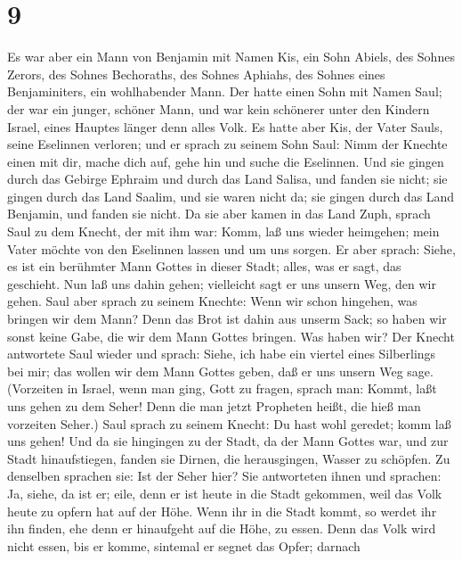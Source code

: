 \hypertarget{section-8}{%
\section{9}\label{section-8}}

 Es war aber ein Mann von Benjamin mit Namen Kis, ein Sohn
Abiels, des Sohnes Zerors, des Sohnes Bechoraths, des Sohnes Aphiahs,
des Sohnes eines Benjaminiters, ein wohlhabender Mann.  Der
hatte einen Sohn mit Namen Saul; der war ein junger, schöner Mann, und
war kein schönerer unter den Kindern Israel, eines Hauptes länger denn
alles Volk.  Es hatte aber Kis, der Vater Sauls, seine
Eselinnen verloren; und er sprach zu seinem Sohn Saul: Nimm der Knechte
einen mit dir, mache dich auf, gehe hin und suche die Eselinnen.
 Und sie gingen durch das Gebirge Ephraim und durch das Land
Salisa, und fanden sie nicht; sie gingen durch das Land Saalim, und sie
waren nicht da; sie gingen durch das Land Benjamin, und fanden sie
nicht.  Da sie aber kamen in das Land Zuph, sprach Saul zu
dem Knecht, der mit ihm war: Komm, laß uns wieder heimgehen; mein Vater
möchte von den Eselinnen lassen und um uns sorgen.  Er aber
sprach: Siehe, es ist ein berühmter Mann Gottes in dieser Stadt; alles,
was er sagt, das geschieht. Nun laß uns dahin gehen; vielleicht sagt er
uns unsern Weg, den wir gehen.  Saul aber sprach zu seinem
Knechte: Wenn wir schon hingehen, was bringen wir dem Mann? Denn das
Brot ist dahin aus unserm Sack; so haben wir sonst keine Gabe, die wir
dem Mann Gottes bringen. Was haben wir?  Der Knecht
antwortete Saul wieder und sprach: Siehe, ich habe ein viertel eines
Silberlings bei mir; das wollen wir dem Mann Gottes geben, daß er uns
unsern Weg sage.  (Vorzeiten in Israel, wenn man ging, Gott
zu fragen, sprach man: Kommt, laßt uns gehen zu dem Seher! Denn die man
jetzt Propheten heißt, die hieß man vorzeiten Seher.)  Saul
sprach zu seinem Knecht: Du hast wohl geredet; komm laß uns gehen! Und
da sie hingingen zu der Stadt, da der Mann Gottes war,  und
zur Stadt hinaufstiegen, fanden sie Dirnen, die herausgingen, Wasser zu
schöpfen. Zu denselben sprachen sie: Ist der Seher hier? 
Sie antworteten ihnen und sprachen: Ja, siehe, da ist er; eile, denn er
ist heute in die Stadt gekommen, weil das Volk heute zu opfern hat auf
der Höhe.  Wenn ihr in die Stadt kommt, so werdet ihr ihn
finden, ehe denn er hinaufgeht auf die Höhe, zu essen. Denn das Volk
wird nicht essen, bis er komme, sintemal er segnet das Opfer; darnach
